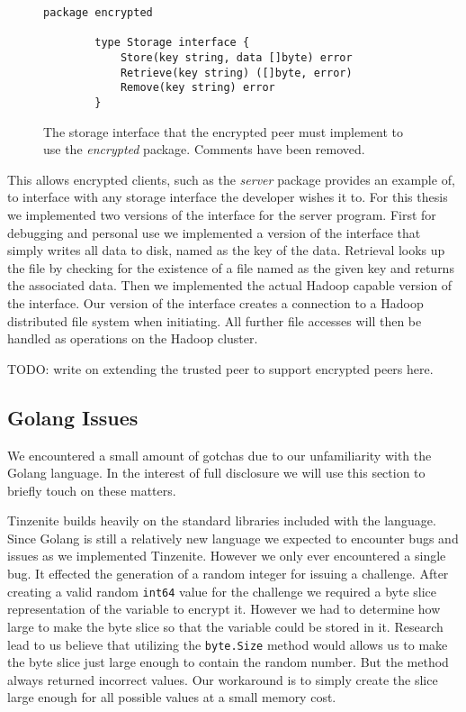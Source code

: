 \begin{figure}[htp]
    \begin{lstlisting}[language=golang,firstnumber=0]
        package encrypted

        type Storage interface {
        	Store(key string, data []byte) error
        	Retrieve(key string) ([]byte, error)
        	Remove(key string) error
        }
    \end{lstlisting}
\caption[Encrypted Storage Interface]{The storage interface that the encrypted peer must implement to use the \emph{encrypted} package. Comments have been removed.}
\label{golang:storage_interface}
\end{figure}

This allows encrypted clients, such as the \emph{server} package provides an example of, to interface with any storage interface the developer wishes it to.
For this thesis we implemented two versions of the interface for the server program.
First for debugging and personal use we implemented a version of the interface that simply writes all data to disk, named as the key of the data.
Retrieval looks up the file by checking for the existence of a file named as the given key and returns the associated data.
Then we implemented the actual Hadoop capable version of the interface.
Our version of the interface creates a connection to a Hadoop distributed file system when initiating.
All further file accesses will then be handled as operations on the Hadoop cluster.

TODO: write on extending the trusted peer to support encrypted peers here.

\subsection{Golang Issues}
\label{sub:Golang Issues}

We encountered a small amount of gotchas due to our unfamiliarity with the Golang language.
In the interest of full disclosure we will use this section to briefly touch on these matters.

Tinzenite builds heavily on the standard libraries included with the language.
Since Golang is still a relatively new language we expected to encounter bugs and issues as we implemented Tinzenite.
However we only ever encountered a single bug.
It effected the generation of a random integer for issuing a challenge.
After creating a valid random \texttt{int64} value for the challenge we required a byte slice representation of the variable to encrypt it.
However we had to determine how large to make the byte slice so that the variable could be stored in it.
Research lead to us believe that utilizing the \texttt{byte.Size} method would allows us to make the byte slice just large enough to contain the random number.
But the method always returned incorrect values.
Our workaround is to simply create the slice large enough for all possible values at a small memory cost.

